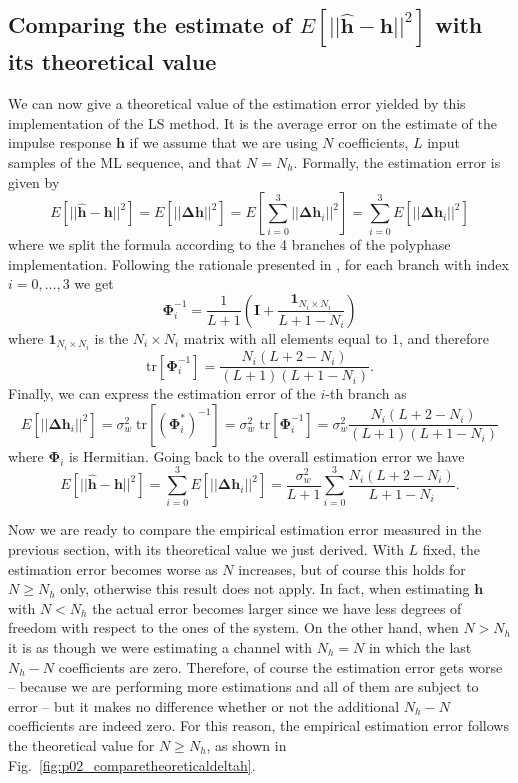 \documentclass[10pt]{article}
\newcommand{\tr} {\mathrm{tr}}
\begin{document}
\subsection*{Comparing the estimate of $E[||\mathbf{\hat{h}}-\mathbf{h}||^2]$ with its theoretical value}

We can now give a theoretical value of the estimation error yielded by this implementation of the LS method. It is the average error on the estimate of the impulse response $\mathbf{h}$ if we assume that we are using $N$ coefficients, $L$ input samples of the ML sequence, and that $N=N_h$. Formally, the estimation error is given by
\begin{equation}
	E[||\mathbf{\hat{h}}-\mathbf{h}||^2] = E[||\mathbf{\Delta h}||^2] = E[\sum_{i=0}^{3} ||\mathbf{\Delta h}_i||^2] = \sum_{i=0}^{3} E[||\mathbf{\Delta h}_i||^2]
\end{equation}
where we split the formula according to the 4 branches of the polyphase implementation. Following the rationale presented in \cite{bc}, for each branch with index $i=0,\ldots,3$ we get
\begin{equation}
	\mathbf{\Phi}_i^{-1} = \frac{1}{L+1} \left( \mathbf{I} + \frac{\mathbf{1}_{N_i \times N_i}}{L+1-N_i} \right)
\end{equation}
where $\mathbf{1}_{N_i \times N_i}$ is the $N_i \times N_i$ matrix with all elements equal to $1$, and therefore
\begin{equation}
	\tr [\mathbf{\Phi}_i^{-1}] = \frac{N_i(L+2-N_i)}{(L+1)(L+1-N_i)}.
\end{equation}
Finally, we can express the estimation error of the $i$-th branch as
\begin{equation}
	E[||\mathbf{\Delta h}_i||^2] = \sigma_w^2 \; \tr [(\mathbf{\Phi}_i^*)^{-1}] = \sigma_w^2 \; \tr [\mathbf{\Phi}_i^{-1}] = \sigma_w^2 \frac{N_i(L+2-N_i)}{(L+1)(L+1-N_i)}
\end{equation}
where $\mathbf{\Phi}_i$ is Hermitian. Going back to the overall estimation error we have
\begin{equation}
	E[||\mathbf{\hat{h}}-\mathbf{h}||^2] = \sum_{i=0}^{3} E[||\mathbf{\Delta h}_i||^2] = \frac{\sigma_w^2}{L+1} \sum_{i=0}^{3} \frac{N_i (L+2-N_i)}{L+1-N_i}.
\end{equation}

Now we are ready to compare the empirical estimation error measured in the previous section, with its theoretical value we just derived. With $L$ fixed, the estimation error becomes worse as $N$ increases, but of course this holds for $N \geq N_h$ only, otherwise this result does not apply. In fact, when estimating $\mathbf{h}$ with $N<N_h$ the actual error becomes larger since we have less degrees of freedom with respect to the ones of the system. On the other hand, when $N > N_h$ it is as though we were estimating a channel with $N_h = N$ in which the last $N_h - N$ coefficients are zero. Therefore, of course the estimation error gets worse -- because we are performing more estimations and all of them are subject to error -- but it makes no difference whether or not the additional $N_h - N$ coefficients are indeed zero. For this reason, the empirical estimation error follows the theoretical value for $N \geq N_h$, as shown in Fig.~\ref{fig:p02_comparetheoreticaldeltah}.
\end{document}
